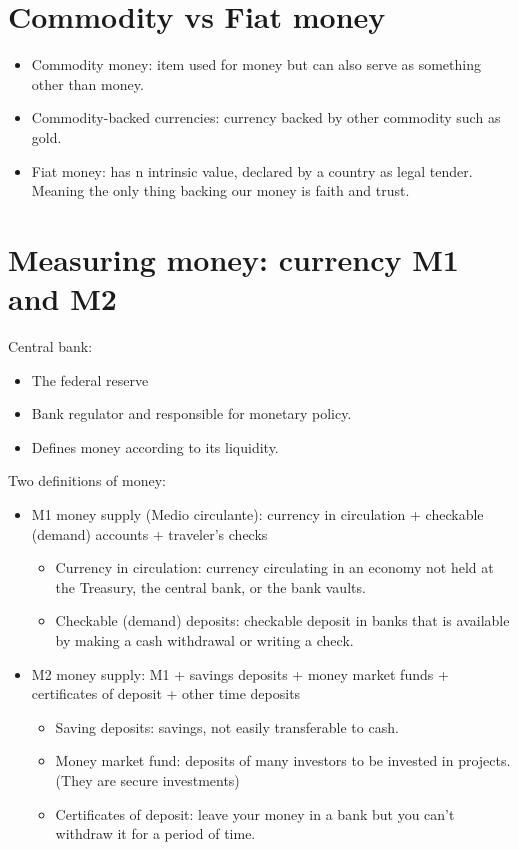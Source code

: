 \documentclass[openany]{book}
\begin{document}
\section{Commodity vs Fiat money}
\begin{itemize}
    \item Commodity money: item used for money but can also serve as something other than money. 
    \item Commodity-backed currencies: currency backed by other commodity such as gold. 
    \item Fiat money: has n intrinsic value, declared by a country as legal tender. Meaning the only thing backing our money is faith and trust. 
\end{itemize}

\section{Measuring money: currency M1 and M2}
Central bank: 
\begin{itemize}
    \item The federal reserve 
    \item Bank regulator and responsible for monetary policy. 
    \item Defines money according to its liquidity. 
\end{itemize}
Two definitions of money: 
\begin{itemize}
    \item M1 money supply (Medio circulante): currency in circulation + checkable (demand) accounts + traveler's checks
        \begin{itemize}
            \item Currency in circulation: currency circulating in an economy not held at the Treasury, the central bank, or the bank vaults.
            \item Checkable (demand) deposits: checkable deposit in banks that is available by making a cash withdrawal or writing a check.
        \end{itemize}
    \item M2 money supply: M1 + savings deposits + money market funds + certificates of deposit + other time deposits
        \begin{itemize}
            \item Saving deposits: savings, not easily transferable to cash. 
            \item Money market fund: deposits of many investors to be invested in projects. (They are secure investments)
            \item Certificates of deposit: leave your money in a bank but you can't withdraw it for a period of time. 
        \end{itemize}
\end{itemize}
\end{document}
